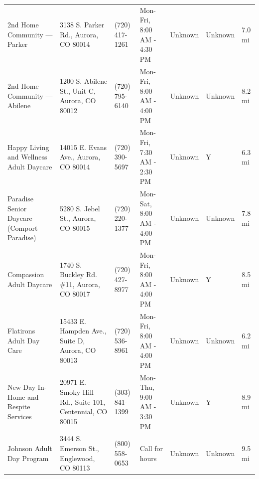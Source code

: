 \documentclass[11pt,landscape]{article}
\begin{document}
\begin{longtable}{p{3.5cm}p{4cm}p{2.2cm}p{3cm}p{1.5cm}p{1.5cm}p{1.2cm}}
2nd Home Community — Parker & 3138 S. Parker Rd., Aurora, CO 80014 & (720) 417-1261 & Mon-Fri, 8:00 AM - 4:30 PM & Unknown & Unknown & 7.0 mi \\
2nd Home Community — Abilene & 1200 S. Abilene St., Unit C, Aurora, CO 80012 & (720) 795-6140 & Mon-Fri, 8:00 AM - 4:00 PM & Unknown & Unknown & 8.2 mi \\
Happy Living and Wellness Adult Daycare & 14015 E. Evans Ave., Aurora, CO 80014 & (720) 390-5697 & Mon-Fri, 7:30 AM - 2:30 PM & Unknown & Y & 6.3 mi \\
Paradise Senior Daycare (Comport Paradise) & 5280 S. Jebel St., Aurora, CO 80015 & (720) 220-1377 & Mon-Sat, 8:00 AM - 4:00 PM & Unknown & Unknown & 7.8 mi \\
Compassion Adult Daycare & 1740 S. Buckley Rd. \#11, Aurora, CO 80017 & (720) 427-8977 & Mon-Fri, 8:00 AM - 4:00 PM & Unknown & Y & 8.5 mi \\
Flatirons Adult Day Care & 15433 E. Hampden Ave., Suite D, Aurora, CO 80013 & (720) 536-8961 & Mon-Fri, 8:00 AM - 4:00 PM & Unknown & Unknown & 6.2 mi \\
New Day In-Home and Respite Services & 20971 E. Smoky Hill Rd., Suite 101, Centennial, CO 80015 & (303) 841-1399 & Mon-Thu, 9:00 AM - 3:30 PM & Unknown & Y & 8.9 mi \\
Johnson Adult Day Program & 3444 S. Emerson St., Englewood, CO 80113 & (800) 558-0653 & Call for hours & Unknown & Unknown & 9.5 mi \\
\bottomrule
\end{longtable}
\end{document}
